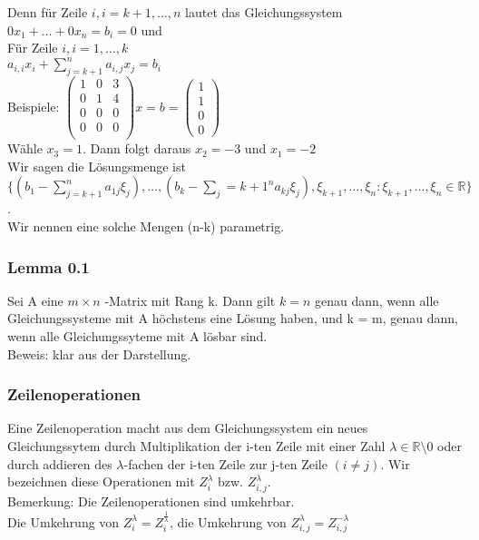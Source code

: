 \documentclass{scrartcl}
\newcommand{\lb}{\lambda}
\newcommand{\mlb}{\(\lb\)}
\newcommand{\R}{\mathbb{R}}
\begin{document}
Denn f\"ur Zeile \(i, i=k+1, \dots, n\) lautet das Gleichungssystem \(0x_1 + \dots + 0x_n = b_i = 0\) und \\
F\"ur Zeile \(i, i =1, \dots, k\) \\
\(a_{i, i} x_i + \sum_{j=k+1}^n a_{i,j} x_j = b_i\)\\
Beispiele:
\(
\begin{pmatrix}
1 & 0 & 3\\
0 & 1 & 4\\
0 & 0 & 0\\
0 & 0 & 0\\
\end{pmatrix} x = b =
\begin{pmatrix}
1\\1\\0\\0
\end{pmatrix}
\)\\
W\"ahle \(x_3 = 1\). Dann folgt daraus \(x_2 = -3\) und \(x_1 = -2\)\\
Wir sagen die L\"osungsmenge ist \\
\(\{(b_1 - \sum_{j=k+1}^na_{1j}\xi_j), \dots,  (b_k - \sum_j={k+1}^na_{kj}\xi_j), \xi_{k+1}, \dots, \xi_n : \xi_{k+1}, \dots, \xi_n \in \R\}\).\\
Wir nennen eine solche Mengen (n-k) parametrig.

\subsubsection{Lemma 0.1}
Sei A eine \(m\times n\) -Matrix mit Rang k. Dann gilt \(k=n\)  genau dann, wenn alle Gleichungssysteme mit A h\"ochstens eine L\"osung haben, und k = m, genau dann, wenn alle Gleichungssyteme mit A l\"osbar sind.\\
Beweis: klar aus der Darstellung.\\

\subsubsection{Zeilenoperationen}
Eine Zeilenoperation macht aus dem Gleichungssystem ein neues Gleichungssytem durch Multiplikation  der i-ten Zeile mit einer Zahl \(\lb \in \R \setminus 0\) oder durch addieren des \mlb -fachen der i-ten Zeile zur j-ten Zeile \((i \neq j)\). Wir bezeichnen diese Operationen mit \(Z_i^\lb\) bzw. \(Z_{i,j}^\lb\).\\
Bemerkung: Die Zeilenoperationen sind umkehrbar. \\
Die Umkehrung von \(Z_i^\lb = Z_i^{\frac{1}{\lb}}\), die Umkehrung von \(Z_{i,j}^\lb = Z_{i,j}^{-\lb}\)
\end{document}
